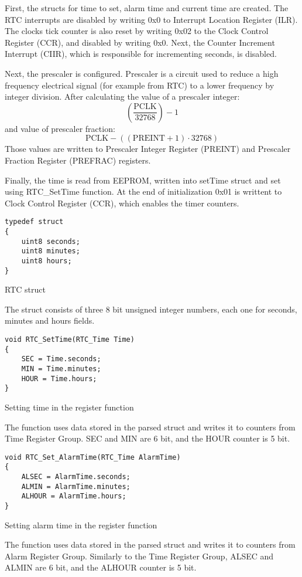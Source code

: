 \documentclass[10pt]{article}
\begin{document}
First, the structs for time to set, alarm time and current time are created. The RTC interrupts are disabled by writing 0x0 to Interrupt Location Register (ILR).  The clocks tick counter is also reset by writing 0x02 to the Clock Control Register (CCR), and disabled by writing 0x0. Next, the Counter Increment Interrupt (CIIR), which is responsible for incrementing seconds, is disabled. 

Next, the prescaler is configured. Prescaler is a circuit used to reduce a high frequency electrical signal (for example from RTC) to a lower frequency by integer division. After calculating the value of a prescaler integer:
\[ \left(\frac{\mathrm{PCLK}}{32768}\right) - 1 \]
and value of prescaler fraction:
\[ \mathrm{PCLK} - \left((\mathrm{PREINT} + 1) \cdot 32768\right) \]
Those values are written to Prescaler Integer Register (PREINT) and Prescaler Fraction Register (PREFRAC) registers.

Finally, the time is read from EEPROM, written into setTime struct and set using RTC\_SetTime function. At the end of initialization 0x01 is writtent to Clock Control Register (CCR), which enables the timer counters.

\begin{program}[H]
	\begin{lstlisting}
typedef struct
{
	uint8 seconds;
	uint8 minutes;
	uint8 hours;
} 
	\end{lstlisting}
	\caption{RTC struct}
\end{program}
The struct consists of three 8 bit unsigned integer numbers, each one for seconds, minutes and hours fields.

\begin{program}[H]
	\begin{lstlisting}
void RTC_SetTime(RTC_Time Time)
{
	SEC = Time.seconds;
	MIN = Time.minutes;
	HOUR = Time.hours;
}
	\end{lstlisting}
	\caption{Setting time in the register function}
\end{program}
The function uses data stored in the parsed struct and writes it to counters from Time Register Group. SEC and MIN are 6 bit, and the HOUR counter is 5 bit.

\begin{program}[H]
	\begin{lstlisting}
void RTC_Set_AlarmTime(RTC_Time AlarmTime)
{
	ALSEC = AlarmTime.seconds;
	ALMIN = AlarmTime.minutes;
	ALHOUR = AlarmTime.hours;
}
	\end{lstlisting}
	\caption{Setting alarm time in the register function}
\end{program}
The function uses data stored in the parsed struct and writes it to counters from Alarm Register Group. Similarly to the Time Register Group, ALSEC and ALMIN are 6 bit, and the ALHOUR counter is 5 bit.
\end{document}
